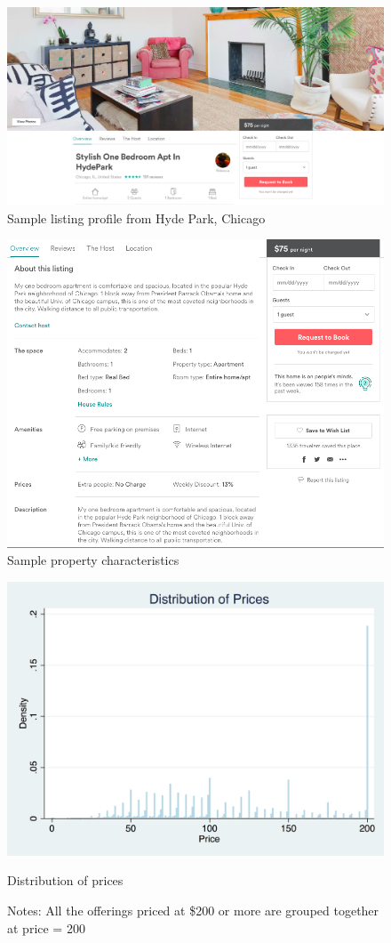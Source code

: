 \singlespacing

\begin{figure}[h]
	\includegraphics[width=1\textwidth]{tables/sample1-cover}
	\caption{Sample listing profile from Hyde Park, Chicago}
\end{figure}
\begin{figure}
	\includegraphics[width=1\textwidth]{tables/sample2-property}
	\caption{Sample property characteristics}
\end{figure}

\begin{figure}\centering
	\includegraphics[width=.8\textwidth]{figures/price_dist-DISC-100}
	\caption{Distribution of prices}
	\caption*{Notes: All the offerings priced at \$200 or more are grouped together at price = 200}
\end{figure}

